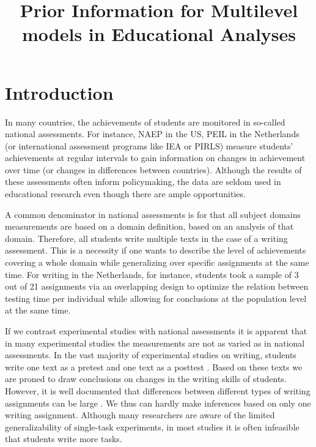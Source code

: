 \documentclass[man, mask]{apa7}
\title{Prior Information for Multilevel models in Educational Analyses}
\date{}
\begin{document}
\maketitle

\section{Introduction}

In many countries, the achievements of students are monitored in so-called national assessments.
For instance, NAEP in the US, PEIL in the Netherlands (or international assessment programs like IEA or PIRLS) measure students' achievements at regular intervals to gain information on changes in achievement over time (or changes in differences between countries).
Although the results of these assessments often inform policymaking, the data are seldom used in educational research even though there are ample opportunities.

A common denominator in national assessments is for that all subject domains measurements are based on a domain definition, based on an analysis of that domain.
Therefore, all students write multiple texts in the case of a writing assessment.
This is a necessity if one wants to describe the level of achievements covering a whole domain while generalizing over specific assignments at the same time.
For writing in the Netherlands, for instance, students took a sample of 3 out of 21 assignments \parencite{zwarts1990balans} via an overlapping design to optimize the relation between testing time per individual while allowing for conclusions at the population level at the same time.

If we contrast experimental studies with national assessments it is apparent that in many experimental studies the measurements are not as varied as in national assessments.
In the vast majority of experimental studies on writing, students write one text as a pretest and one text as a posttest \parencite[e.g.,][]{graham2014conducting}.
Based on these texts we are proned to draw conclusions on changes in the writing skills of students.
However, it is well documented that differences between different types of writing assignments can be large \parencite[e.g.,][]{bouwer2015effect}.
We thus can hardly make inferences based on only one writing assignment.
Although many researchers are aware of the limited generalizability of single-task experiments, in most studies it is often infeasible that students write more tasks.
\end{document}
